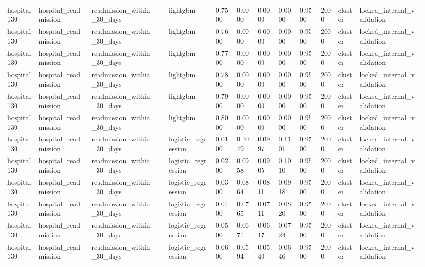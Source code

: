 \begin{tabular}{lllllllllllll}
hospital130 & hospital\_readmission & readmission\_within\_30\_days &  & lightgbm & 0.7500 & 0.0000 & 0.0000 & 0.0000 & 0.9500 & 2000 & cluster & locked\_internal\_validation \\
hospital130 & hospital\_readmission & readmission\_within\_30\_days &  & lightgbm & 0.7600 & 0.0000 & 0.0000 & 0.0000 & 0.9500 & 2000 & cluster & locked\_internal\_validation \\
hospital130 & hospital\_readmission & readmission\_within\_30\_days &  & lightgbm & 0.7700 & 0.0000 & 0.0000 & 0.0000 & 0.9500 & 2000 & cluster & locked\_internal\_validation \\
hospital130 & hospital\_readmission & readmission\_within\_30\_days &  & lightgbm & 0.7800 & 0.0000 & 0.0000 & 0.0000 & 0.9500 & 2000 & cluster & locked\_internal\_validation \\
hospital130 & hospital\_readmission & readmission\_within\_30\_days &  & lightgbm & 0.7900 & 0.0000 & 0.0000 & 0.0000 & 0.9500 & 2000 & cluster & locked\_internal\_validation \\
hospital130 & hospital\_readmission & readmission\_within\_30\_days &  & lightgbm & 0.8000 & 0.0000 & 0.0000 & 0.0000 & 0.9500 & 2000 & cluster & locked\_internal\_validation \\
hospital130 & hospital\_readmission & readmission\_within\_30\_days &  & logistic\_regression & 0.0100 & 0.1049 & 0.0997 & 0.1101 & 0.9500 & 2000 & cluster & locked\_internal\_validation \\
hospital130 & hospital\_readmission & readmission\_within\_30\_days &  & logistic\_regression & 0.0200 & 0.0958 & 0.0905 & 0.1010 & 0.9500 & 2000 & cluster & locked\_internal\_validation \\
hospital130 & hospital\_readmission & readmission\_within\_30\_days &  & logistic\_regression & 0.0300 & 0.0864 & 0.0811 & 0.0918 & 0.9500 & 2000 & cluster & locked\_internal\_validation \\
hospital130 & hospital\_readmission & readmission\_within\_30\_days &  & logistic\_regression & 0.0400 & 0.0765 & 0.0711 & 0.0820 & 0.9500 & 2000 & cluster & locked\_internal\_validation \\
hospital130 & hospital\_readmission & readmission\_within\_30\_days &  & logistic\_regression & 0.0500 & 0.0671 & 0.0617 & 0.0724 & 0.9500 & 2000 & cluster & locked\_internal\_validation \\
hospital130 & hospital\_readmission & readmission\_within\_30\_days &  & logistic\_regression & 0.0600 & 0.0594 & 0.0540 & 0.0646 & 0.9500 & 2000 & cluster & locked\_internal\_validation \\

\end{tabular}
